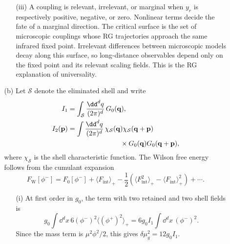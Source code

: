 \begin{enumerate}
\begin{enumerate}
\begin{enumerate}
      \item[(iii)] A coupling is relevant, irrelevant, or marginal when
      \(y_r\) is respectively positive, negative, or zero.  Nonlinear terms
      decide the fate of a marginal direction.  The critical surface is the
      set of microscopic couplings whose RG trajectories approach the same
      infrared fixed point.  Irrelevant differences between microscopic
      models decay along this surface, so long-distance observables depend
      only on the fixed point and its relevant scaling fields.  This is the
      RG explanation of universality.
    \end{enumerate}

    \item[(b)]
    Let \(\mathcal S\) denote the eliminated shell and write
    \[
      \begin{aligned}
        I_1&=\int_{\mathcal S}\frac{\dd^dq}{(2\pi)^d}\,G_0(\mathbf q),\\
        I_2(\mathbf p)&=\int\frac{\dd^dq}{(2\pi)^d}\,
          \chi_{\mathcal S}(\mathbf q)\chi_{\mathcal S}(\mathbf q+\mathbf p)\\
        &\hspace{27mm}\times
          G_0(\mathbf q)G_0(\mathbf q+\mathbf p),
      \end{aligned}
    \]
    where \(\chi_{\mathcal S}\) is the shell characteristic function.
    The Wilson free energy follows from the cumulant expansion
    \[
      F_{\mathrm W}[\phi^-]=F_0[\phi^-]
      +\langle F_{\mathrm{int}}\rangle_+
      -\frac12\left(
        \langle F_{\mathrm{int}}^2\rangle_+
        -\langle F_{\mathrm{int}}\rangle_+^2
      \right)+\cdots.
    \]
    \begin{enumerate}
      \item[(i)] At first order in \(g_0\), the term with two retained and
      two shell fields is
      \[
        g_0\int \dd^dx\,6(\phi^-)^2
          \langle(\phi^+)^2\rangle_+
        =6g_0I_1\int \dd^dx\,(\phi^-)^2.
      \]
      Since the mass term is \(\mu^2\phi^2/2\), this gives
      \(\delta\mu_g^2=12g_0I_1\).


\end{enumerate}
\end{enumerate}
\end{enumerate}
